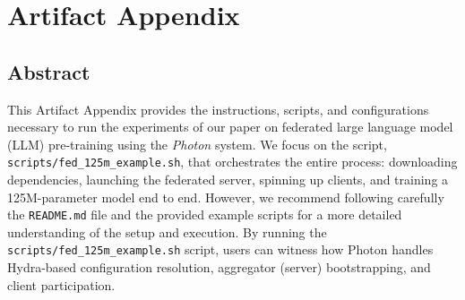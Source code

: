 \documentclass{sigplanconf}
\begin{document}


\appendix

\section{Artifact Appendix}

\subsection{Abstract}
This Artifact Appendix provides the instructions, scripts, and configurations necessary to run the experiments of our paper on federated large language model (LLM) pre-training using the \textit{Photon} system.
We focus on the script, \texttt{scripts/fed\_125m\_example.sh}, that orchestrates the entire process: downloading dependencies, launching the federated server, spinning up clients, and training a 125M-parameter model end to end.
However, we recommend following carefully the \texttt{README.md} file and the provided example scripts for a more detailed understanding of the setup and execution.
By running the \texttt{scripts/fed\_125m\_example.sh} script, users can witness how Photon handles Hydra-based configuration resolution, aggregator (server) bootstrapping, and client participation.
\end{document}
